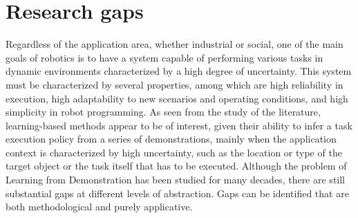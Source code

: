 \section{Research gaps}
\label{sec:research_gaps}
Regardless of the application area, whether industrial or social, one of the main goals of robotics is to have a system capable of performing various tasks in dynamic environments characterized by a high degree of uncertainty. This system must be characterized by several properties, among which are high reliability in execution, high adaptability to new scenarios and operating conditions, and high simplicity in robot programming. As seen from the study of the literature, learning-based methods appear to be of interest, given their ability to infer a task execution policy from a series of demonstrations, mainly when the application context is characterized by high uncertainty, such as the location or type of the target object or the task itself that has to be executed. Although the problem of Learning from Demonstration has been studied for many decades, there are still substantial gaps at different levels of abstraction. Gaps can be identified that are both methodological and purely applicative.

